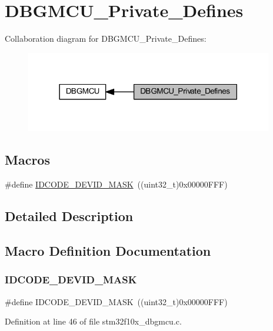 \hypertarget{group___d_b_g_m_c_u___private___defines}{}\section{D\+B\+G\+M\+C\+U\+\_\+\+Private\+\_\+\+Defines}
\label{group___d_b_g_m_c_u___private___defines}
Collaboration diagram for D\+B\+G\+M\+C\+U\+\_\+\+Private\+\_\+\+Defines\+:
\nopagebreak
\begin{figure}[H]
\begin{center}
\leavevmode
\includegraphics[width=306pt]{group___d_b_g_m_c_u___private___defines}
\end{center}
\end{figure}
\subsection*{Macros}
\begin{DoxyCompactItemize}
\item 
\#define \hyperlink{group___d_b_g_m_c_u___private___defines_gaeeece10cca80f3c632d3d77c3f2917b6}{I\+D\+C\+O\+D\+E\+\_\+\+D\+E\+V\+I\+D\+\_\+\+M\+A\+SK}~((uint32\+\_\+t)0x00000\+F\+F\+F)
\end{DoxyCompactItemize}


\subsection{Detailed Description}


\subsection{Macro Definition Documentation}
\mbox{\label{group___d_b_g_m_c_u___private___defines_gaeeece10cca80f3c632d3d77c3f2917b6}} 
\subsubsection{\texorpdfstring{I\+D\+C\+O\+D\+E\+\_\+\+D\+E\+V\+I\+D\+\_\+\+M\+A\+SK}{IDCODE\_DEVID\_MASK}}
{\footnotesize\ttfamily \#define I\+D\+C\+O\+D\+E\+\_\+\+D\+E\+V\+I\+D\+\_\+\+M\+A\+SK~((uint32\+\_\+t)0x00000\+F\+F\+F)}



Definition at line 46 of file stm32f10x\+\_\+dbgmcu.\+c.

